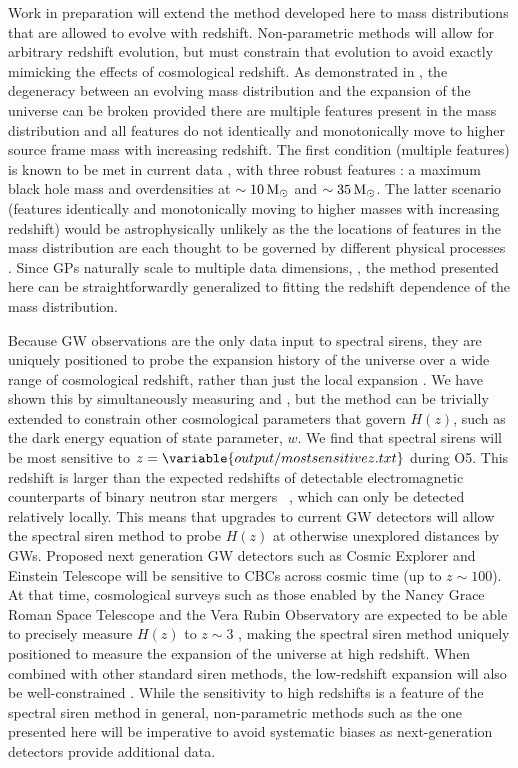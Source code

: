 \documentclass[preprint2,linenumbers]{aastex631}
\begin{document}
Work in preparation will extend the method developed here to mass distributions that are allowed to evolve with redshift.
Non-parametric methods will allow for arbitrary redshift evolution, but must constrain that evolution to avoid exactly mimicking the effects of cosmological redshift.
As demonstrated in \citet{ezquiaga_spectral_2022}, the degeneracy between an evolving mass distribution and the expansion of the universe can be broken provided there are multiple features present in the mass distribution and all features do not identically and monotonically move to higher source frame mass with increasing redshift.
The first condition (multiple features) is known to be met in current data \citep{abbott_population_2023}, with three robust features \citep{farah_things_2023}: a maximum black hole mass and overdensities at $\sim10\,\text{M}_{\odot}$ and $\sim35\,\text{M}_{\odot}$.
The latter scenario (features identically and monotonically moving to higher masses with increasing redshift) would be astrophysically unlikely as the the locations of features in the mass distribution are each thought to be governed by different physical processes \citep{mapelli_binary_2020}.
Since \aclp{GP} naturally scale to multiple data dimensions, \citep{rasmussen_gaussian_2006}, the method presented here can be straightforwardly generalized to fitting the redshift dependence of the mass distribution. 

Because \ac{GW} observations are the only data input to spectral sirens, they are uniquely positioned to probe the expansion history of the universe over a wide range of cosmological redshift, rather than just the local expansion \Ho.
We have shown this by simultaneously measuring \Omm{} and \Ho{}, but the method can be trivially extended to constrain other cosmological parameters that govern $H(z)$, such as the dark energy equation of state parameter, $w$. 
We find that spectral sirens will be most sensitive to $z=\variable{output/mostsensitivez.txt}$ during \acf{O5}.
This redshift is larger than the expected redshifts of detectable electromagnetic counterparts of binary neutron star mergers ~\citep{kiendrebeogo_updated_2023}, which can only be detected relatively locally.
This means that upgrades to current \ac{GW} detectors will allow the spectral siren method to probe $H(z)$ at otherwise unexplored distances by \acp{GW}. 
Proposed next generation \ac{GW} detectors such as Cosmic Explorer and Einstein Telescope will be sensitive to \acp{CBC} across cosmic time (up to $z\sim100$).
At that time, cosmological surveys such as those enabled by the Nancy Grace Roman Space Telescope and the Vera Rubin Observatory are expected to be able to precisely measure $H(z)$ to $z\sim3$ \citep{spergel_wide-field_2015}, making the spectral siren method uniquely positioned to measure the expansion of the universe at high redshift.
When combined with other standard siren methods, the low-redshift expansion will also be well-constrained \citep{Chen:2024gdn}.
While the sensitivity to high redshifts is a feature of the spectral siren method in general, non-parametric methods such as the one presented here will be imperative to avoid systematic biases as next-generation detectors provide additional data. 
\end{document}
